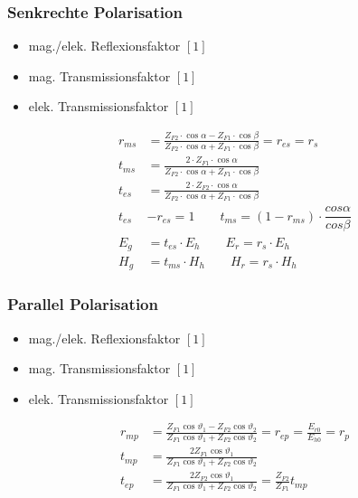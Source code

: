 \subsubsection{Senkrechte Polarisation}


\begin{itemize}
    \item mag./elek. Reflexionsfaktor $[1]$
    \item mag. Transmissionsfaktor $[1]$
    \item elek. Transmissionsfaktor $[1]$
\end{itemize}

\begin{align*}
    r_{m s} &= \frac{Z_{F 2} \cdot \cos \alpha-Z_{F 1} \cdot \cos \beta}{Z_{F 2} \cdot \cos \alpha+Z_{F 1} \cdot \cos \beta} = r_{e s} = r_{s}\\
    t_{m s} &= \frac{2 \cdot Z_{F 1} \cdot \cos \alpha}{Z_{F 2} \cdot \cos \alpha+Z_{F 1} \cdot \cos \beta}\\
    t_{e s} &= \frac{2 \cdot Z_{F 2} \cdot \cos \alpha}{Z_{F 2} \cdot \cos \alpha+Z_{F 1} \cdot \cos \beta}\\
    t_{e s} &-r_{e s}= 1 \qquad t_{m s} = (1 - r_{m s}) \cdot \dfrac{cos \alpha}{cos \beta}\\
    E_{g} &= t_{e s} \cdot E_{h} \qquad E_{r} = r_{s} \cdot E_{h}\\
    H_{g} &= t_{m s} \cdot H_{h} \qquad H_{r} = r_{s} \cdot H_{h}
\end{align*}

\subsubsection{Parallel Polarisation}


\begin{itemize}
    \item mag./elek. Reflexionsfaktor $[1]$
    \item mag. Transmissionsfaktor $[1]$
    \item elek. Transmissionsfaktor $[1]$
\end{itemize}

\begin{align*}
    r_{m p} &= \frac{Z_{F 1} \cos \vartheta_{1}-Z_{F 2} \cos \vartheta_{2}}{Z_{F 1} \cos \vartheta_{1}+Z_{F 2} \cos \vartheta_{2}} = r_{e p} = \frac{E_{r 0}}{E_{h 0}} =r_{p}\\
    t_{m p} &= \frac{2 Z_{F 1} \cos \vartheta_{1}}{Z_{F 1} \cos \vartheta_{1}+Z_{F 2} \cos \vartheta_{2}}\\
    t_{e p} &= \frac{2 Z_{F 2} \cos \vartheta_{1}}{Z_{F 1} \cos \vartheta_{1}+Z_{F 2} \cos \vartheta_{2}} = \frac{Z_{F 2}}{Z_{F 1}} t_{m p}
\end{align*}